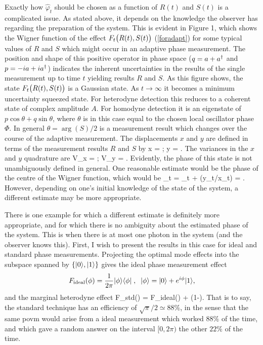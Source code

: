 \documentclass[12pt]{article}
\begin{document}
Exactly how $\hat\varphi_t$ should be chosen as a function of $R(t)$ and $S(t)$
is a complicated issue. As stated above, it depends on the knowledge the observer
has regarding the preparation of the system. This is evident in Figure 1, which 
shows the  Wigner function of the effect
 $F_t{\bigl(} R(t),S(t){\bigr)}$ (\ref{foradapt}) for some typical
values of $R$ and $S$ which might occur in an adaptive phase measurement. The
position and shape of this positive operator in phase space ($q=a+a^\dagger$ and $p =
-ia+ia^\dagger$) indicates the inherent uncertainties in the results of the single
measurement up to time $t$ yielding results $R$ and $S$. As this figure shows, the
state $F_t{\bigl(} R(t),S(t){\bigr)}$ is a Gaussian state. As $t\to\infty$ it becomes a
minimum uncertainty squeezed state. For heterodyne detection this reduces to a
coherent state of complex amplitude $A$. For homodyne detection it is an
eigenstate of $p\cos\theta+q\sin\theta$, where $\theta$ is in this case
equal to the chosen local oscillator phase $\Phi$. In general $\theta=\arg(S)/2$
is a measurement result which changes over the course of the adaptive measurement.
The displacements $x$ and $y$ are defined in terms of the
measurement results $R$ and $S$ by  \beq x =  \;;\;\;  y = . \label{defxy} \eeq  The variances in the $x$ and $y$
quadrature are \beq V_x =  \;;\;\;
 V_y = . \label{defvxvy} \eeq 
 Evidently, the phase of this state is not unambiguously defined in general. One
reasonable estimate would be the phase of the centre of the Wigner function, which
would be  \beq
\hat\varphi_t = \theta_t + \arctan(y_t/x_t) = \arg \left[ R(1-e^{-t}) + S R^* \right].
\eeq
However, depending on one's initial knowledge of the state of the
system, a different estimate may be more appropriate. 

There is one example for which a different estimate is definitely more
appropriate, and for which there is no ambiguity about the estimated phase of the
system. This is when there is at most one photon in the system (and the observer
knows this).  First, I wish to present the results in this case for ideal and
standard phase measurements. Projecting the optimal mode effects into the subspace
spanned by $\{| {0} \rangle,| {1} \rangle\}$ gives the ideal phase measurement effect
\begin{equation} {F}_{\rm ideal}(\phi) = \frac{1}{2\pi} |{\phi}\rangle\langle{\phi}|
\; , \;\;  |{\phi}\rangle =
|{0}\rangle + e^{i\phi}|{1}\rangle, \end{equation}
and the marginal heterodyne effect
\beq
F_{\rm std}(\phi) =  
{F}_{\rm ideal}(\phi) + \left(1-\right). 
\label{std2}
\eeq
That is to say, the standard technique has an efficiency of $\sqrt{\pi}/2 \simeq
88\%$, in the sense that the same {\sc povm} would arise from a ideal measurement
which worked $88\%$ of the time, and which gave a random answer on the interval
$[0,2\pi)$ the other $22\%$ of the time. 
\end{document}
